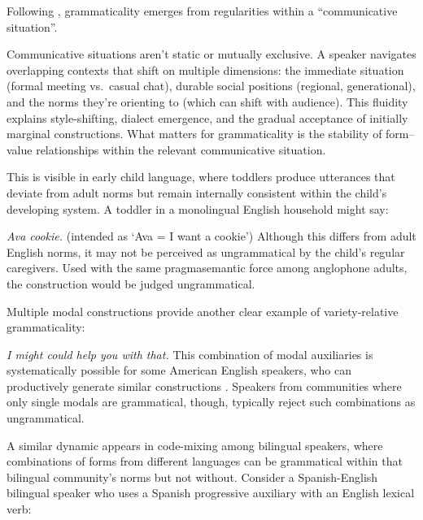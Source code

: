 \documentclass[12pt,letterpaper]{article}
\newcommand{\mention}[1]{\textit{#1}}
\begin{document}
Following \textcite[3]{wiese2023}, grammaticality emerges from regularities within a \enquote{communicative situation}.

Communicative situations aren't static or mutually exclusive. A speaker navigates overlapping contexts that shift on multiple dimensions: the immediate situation (formal meeting vs.\ casual chat), durable social positions (regional, generational), and the norms they're orienting to (which can shift with audience). This fluidity explains style-shifting, dialect emergence, and the gradual acceptance of initially marginal constructions. What matters for grammaticality is the stability of form--value relationships within the relevant communicative situation.

This is visible in early child language, where toddlers produce utterances that deviate from adult norms but remain internally consistent within the child's developing system. A toddler in a monolingual English household might say:

\ea
\mention{Ava cookie.} (intended as `Ava = I want a cookie')
\z
Although this differs from adult English norms, it may not be perceived as ungrammatical by the child's regular caregivers. Used with the same pragmasemantic force among anglophone adults, the construction would be judged ungrammatical.

Multiple modal constructions provide another clear example of variety-relative grammaticality:

\ea
\mention{I might could help you with that.}
\z
This combination of modal auxiliaries is systematically possible for some American English speakers, who can productively generate similar constructions \autocite{morin2024semantics}. Speakers from communities where only single modals are grammatical, though, typically reject such combinations as ungrammatical.

A similar dynamic appears in code-mixing among bilingual speakers, where combinations of forms from different languages can be grammatical within that bilingual community's norms but not without. Consider a Spanish-English bilingual speaker who uses a Spanish progressive auxiliary with an English lexical verb:
\end{document}
